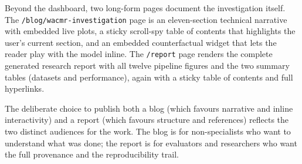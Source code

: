 Beyond the dashboard, two long-form pages document the investigation
itself. The \texttt{/blog/wacmr-investigation} page is an eleven-section
technical narrative with embedded live plots, a sticky scroll-spy
table of contents that highlights the user's current section, and an
embedded counterfactual widget that lets the reader play with the
model inline. The \texttt{/report} page renders the complete generated
research report with all twelve pipeline figures and the two summary
tables (datasets and performance), again with a sticky table of
contents and full hyperlinks.

\begin{finding}
The deliberate choice to publish both a blog (which favours narrative
and inline interactivity) and a report (which favours structure and
references) reflects the two distinct audiences for the work. The
blog is for non-specialists who want to understand what was done; the
report is for evaluators and researchers who want the full provenance
and the reproducibility trail.
\end{finding}
